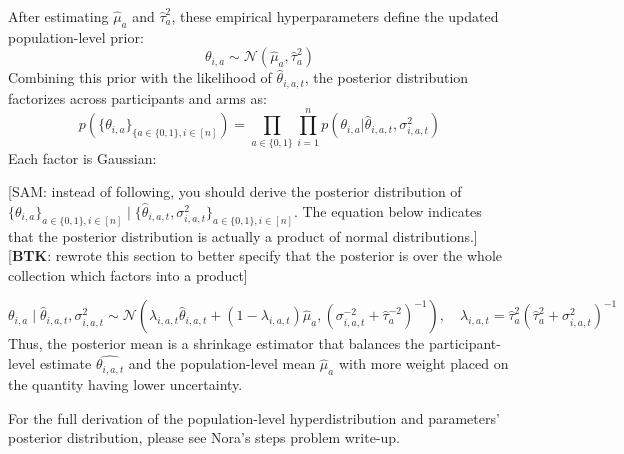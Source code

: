 \documentclass[letterpaper, 9pt]{extarticle}
\newcommand{\sam}[1]{
  {\color{blue} [SAM: {#1}]}
 }
\newcommand{\btk}[1]{%
  {\color{red} [\textbf{BTK}: {#1}]}%
}
\begin{document}
After estimating $\hat{\mu}_a$ and $\hat{\tau}_a^2$, these empirical hyperparameters define the updated population-level prior:
\[
\theta_{i,a} \sim \mathcal{N}(\hat{\mu}_a, \hat{\tau}_a^2)
\]
Combining this prior with the likelihood of $\hat{\theta}_{i,a,t}$, the posterior distribution factorizes across participants and arms as:
\[
p \left(\{\theta_{i,a}\}_{\{a \in \{0,1\}, i \in [n]} \right) = \prod_{a \in \{0,1 \}} \prod_{i=1}^n p(\theta_{i,a} | \hat{{\theta}}_{i,a,t}, \sigma_{i,a,t}^2)
\]
Each factor is Gaussian:


\sam{instead of following, you should derive the posterior distribution of $\{\theta_{i,a}\}_{a\in\{0,1\}, i\in[n]} \mid\{\hat{\theta}_{i,a,t},\sigma^2_{i,a,t}\}_{a\in\{0,1\}, i\in[n]}$.   The equation below indicates that the posterior distribution  is actually a product of normal distributions.} \btk{rewrote this section to better specify that the posterior is over the whole collection which factors into a product} 

\[
\theta_{i,a}\mid\hat{\theta}_{i,a,t},\sigma^2_{i,a,t}
\sim
\mathcal{N}\!\left(
\lambda_{i,a,t}\hat{\theta}_{i,a,t}+(1-\lambda_{i,a,t})\hat{\mu}_a,
(\sigma_{i,a,t}^{-2}+\hat{\tau}_a^{-2})^{-1}
\right), \quad \lambda_{i,a,t}
    =
    \hat{\tau}_a^{2}({\hat{\tau}_a^{2} + \sigma^2_{i,a,t}})^{-1}
\]
Thus, the posterior mean is a shrinkage estimator that balances the participant-level estimate $\hat{{\theta}_{i,a,t}}$ and the population-level mean $\hat{\mu}_a$ with more weight placed on the quantity having lower uncertainty.


For the full derivation of the population-level hyperdistribution and parameters' posterior distribution, please see Nora's steps problem write-up.\autocite{sun_steps}
\end{document}
